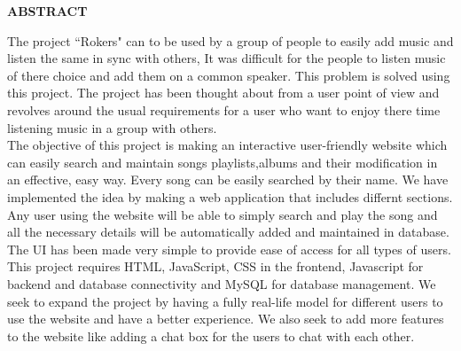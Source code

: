 \pagestyle{empty}
\begin{center}
\textup{\large{\textbf{ABSTRACT}}}
\end{center}

\justify
\indent
The project ``Rokers" can to be used by a group of people to easily add music and listen the same in sync with others, It was difficult for the people to listen music of there choice and add them on a common speaker. This problem is solved using this project. The project has been thought about from a user point of view and revolves around the usual requirements for a user who want to enjoy there time listening music in a group with others.
\\[10pt]

The objective of this project is making an interactive user-friendly website which can easily search and maintain songs playlists,albums and their modification in an effective, easy way. Every song can be easily searched by their name. We have implemented the idea by making a web application that includes differnt sections. Any user using the website will be able to simply search and play the song and all the necessary details will be automatically added and maintained in database. The UI has been made very simple to provide ease of access for all types of users.
\\[10pt]

This project requires HTML, JavaScript, CSS in the frontend, Javascript for backend and database connectivity and MySQL for database management. We seek to expand the project by having a fully real-life model for different users to use the website and have a better experience. We also seek to add more features to the website like adding a chat box for the users to chat with each other. 

\pagebreak
